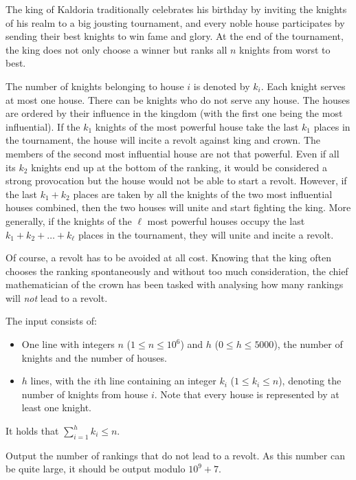 
%
The king of Kaldoria traditionally celebrates his birthday by
inviting the knights of his realm to a big jousting tournament,
and every noble house participates by sending their best knights to win fame and glory.
At the end of the tournament, the king does not only choose a
winner but ranks all $n$ knights from worst to best.

The number of knights belonging to house $i$ is denoted by $k_i$.
Each knight serves at most one house.
There can be knights who do not serve any house.
The houses are ordered by their influence in the kingdom (with the first one being the most influential).
If the $k_1$ knights of the most powerful house take the last $k_1$ places in
the tournament, the house will incite a revolt against king and crown.
The members of the second most influential house are not that powerful.
Even if all its $k_2$ knights end up at the bottom of the ranking, it
would be considered a strong provocation but the house would not be able to start a revolt.
However, if the last $k_1 + k_2$ places are taken by all the
knights of the two most influential houses combined, then the two houses will unite
and start fighting the king.
More generally, if the knights of the $\ell$ most powerful
houses occupy the last $k_1 + k_2 + \dots
+ k_\ell$ places in the tournament, they will unite and incite a revolt.

Of course, a revolt has to be avoided at all cost. Knowing that the
king often chooses the ranking spontaneously and without too much
consideration, the chief mathematician of the crown has been tasked with analysing
how many rankings will \emph{not} lead to a revolt.

\begin{Input}
  The input consists of:
  \begin{itemize}
    \item One line with integers $n$ ($1 \leq n \leq 10^6$) and $h$
      ($0 \leq h \leq 5000$), the number of knights and the
      number of houses.
    \item $h$ lines, with the $i$th line containing an integer $k_i$ ($1 \leq k_i \leq n$),
      denoting the number of knights from house $i$. Note that every
      house is represented by at least one knight.
  \end{itemize}
  It holds that $\sum_{i=1}^h k_i \leq n$.
\end{Input}

\begin{Output}
  Output the number of rankings that do not lead to a revolt. As
  this number can be quite large, it should be output modulo
  $10^9+7$.
\end{Output}
